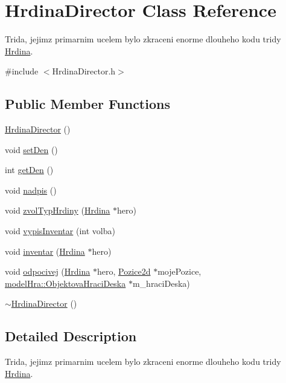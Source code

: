 \hypertarget{class_hrdina_director}{\section{Hrdina\-Director Class Reference}
\label{class_hrdina_director}
}


Trida, jejimz primarnim ucelem bylo zkraceni enorme dlouheho kodu tridy \hyperlink{class_hrdina}{Hrdina}.  




{\ttfamily \#include $<$Hrdina\-Director.\-h$>$}

\subsection*{Public Member Functions}
\begin{DoxyCompactItemize}
\item 
\hyperlink{class_hrdina_director_a4a32c3c60e4f7556fbf123b50a9d2cf2}{Hrdina\-Director} ()
\item 
void \hyperlink{class_hrdina_director_a34948d661df782ac1e02869ececad993}{set\-Den} ()
\item 
int \hyperlink{class_hrdina_director_a10b6ab73100fd1219d181e7fe33d4ea7}{get\-Den} ()
\item 
void \hyperlink{class_hrdina_director_a78d79876d0d150617cde1a2f1ecf5b4e}{nadpis} ()
\item 
void \hyperlink{class_hrdina_director_a495472f8a3334d8068e7cf6b5662dcc3}{zvol\-Typ\-Hrdiny} (\hyperlink{class_hrdina}{Hrdina} $\ast$hero)
\item 
void \hyperlink{class_hrdina_director_a725fde5ddff1309278b2de948243e032}{vypis\-Inventar} (int volba)
\item 
void \hyperlink{class_hrdina_director_a1587d6d13db6a018d9f4b5e24221cf65}{inventar} (\hyperlink{class_hrdina}{Hrdina} $\ast$hero)
\item 
void \hyperlink{class_hrdina_director_a0147b158129d6c22c8bef2c15ca7f7c5}{odpocivej} (\hyperlink{class_hrdina}{Hrdina} $\ast$hero, \hyperlink{struct_pozice2d}{Pozice2d} $\ast$moje\-Pozice, \hyperlink{classmodel_hra_1_1_objektova_hraci_deska}{model\-Hra\-::\-Objektova\-Hraci\-Deska} $\ast$m\-\_\-hraci\-Deska)
\item 
\hyperlink{class_hrdina_director_ab4f4ca87fc194a17b3a8a17e49faeccb}{$\sim$\-Hrdina\-Director} ()
\end{DoxyCompactItemize}


\subsection{Detailed Description}
Trida, jejimz primarnim ucelem bylo zkraceni enorme dlouheho kodu tridy \hyperlink{class_hrdina}{Hrdina}. 

